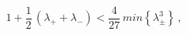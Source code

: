 \begin{equation}
1+\frac{1}{2}\,(\lambda_++\lambda_-)<\frac{4}{27}\,min\left\{\lambda_{\pm}^3
\right\}\,,
\end{equation}

